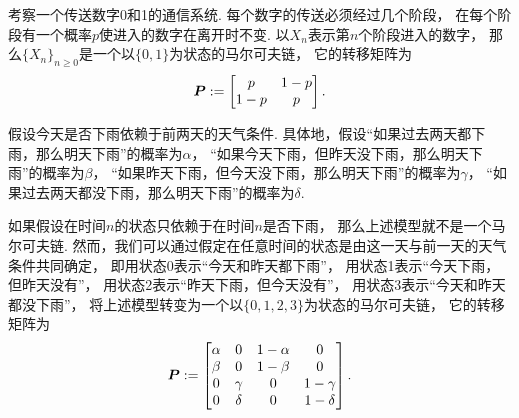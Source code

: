 \begin{example}[通信系统]
考察一个传送数字0和1的通信系统.
每个数字的传送必须经过几个阶段，
在每个阶段有一个概率\(p\)使进入的数字在离开时不变.
以\(X_n\)表示第\(n\)个阶段进入的数字，
那么\(\{X_n\}_{n\geq0}\)是一个以\(\{0,1\}\)为状态的马尔可夫链，
它的转移矩阵为\begin{equation*}
	\boldsymbol{P} := \begin{bmatrix}
		p & 1-p \\
		1-p & p
	\end{bmatrix}.
\end{equation*}
\end{example}

\begin{example}[将一个过程转变为马尔可夫链]
假设今天是否下雨依赖于前两天的天气条件.
具体地，假设“如果过去两天都下雨，那么明天下雨”的概率为\(\alpha\)，
“如果今天下雨，但昨天没下雨，那么明天下雨”的概率为\(\beta\)，
“如果昨天下雨，但今天没下雨，那么明天下雨”的概率为\(\gamma\)，
“如果过去两天都没下雨，那么明天下雨”的概率为\(\delta\).

如果假设在时间\(n\)的状态只依赖于在时间\(n\)是否下雨，
那么上述模型就不是一个马尔可夫链.
然而，我们可以通过假定在任意时间的状态是由这一天与前一天的天气条件共同确定，
即用状态0表示“今天和昨天都下雨”，
用状态1表示“今天下雨，但昨天没有”，
用状态2表示“昨天下雨，但今天没有”，
用状态3表示“今天和昨天都没下雨”，
将上述模型转变为一个以\(\{0,1,2,3\}\)为状态的马尔可夫链，
它的转移矩阵为\begin{equation*}
	\boldsymbol{P} := \begin{bmatrix}
		\alpha & 0 & 1-\alpha & 0 \\
		\beta & 0 & 1-\beta & 0 \\
		0 & \gamma & 0 & 1-\gamma \\
		0 & \delta & 0 & 1-\delta
	\end{bmatrix}.
\end{equation*}
\end{example}
